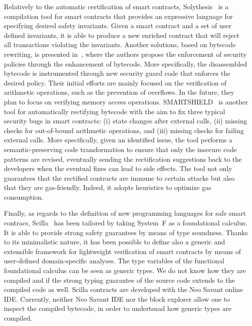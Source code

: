 Relatively to the automatic certification of smart contracts,
Solythesis~\cite{solythesis_solidity_validation} is a compilation tool for smart contracts
that provides an expressive language for specifying desired safety invariants.
Given a smart contract and a set of user defined invariants,
it is able to produce a new enriched contract that will reject all transactions
violating the invariants.
%
Another solutions, based on bytecode rewriting, is presented in~\cite{bytecode_rewriting},
where the authors propose the enforcement of security policies through the enhancement of bytecode.
More specifically, the disassembled bytecode is instrumented through new security guard code
that enforces the desired policy. Their initial efforts are mainly focused on the verification
of arithmetic operations, such as the prevention of overflows. In the future, they plan to focus on
verifying memory access operations.
%
SMARTSHIELD~\cite{smartshield} is another tool for automatically
rectifying bytecode with the aim to fix three typical security bugs in smart contracts:
(i) state changes after external calls, (ii) missing checks for out-of-bound arithmetic operations,
and (iii) missing checks for failing external calls. More specifically, given an identified issue,
the tool performs a semantic-preserving code transformation to ensure that only the insecure code
patterns are revised, eventually sending the rectification suggestions back to the developers
when the eventual fixes can lead to side effects. The tool not only guarantees that the rectified
contracts are immune to certain attacks but also that they are gas-friendly.
Indeed, it adopts heuristics to optimize gas consumption. 


Finally, as regards to the definition of new programming languages for safe smart contracs,
Scilla~\cite{scilla} has been tailored by taking System~F as a foundational calculus.
It is able to provide strong safety guarantees by means of type soundness.
Thanks to its minimalistic nature, it has been possible to define also a generic and extensible
framework for lightweight verification of smart contracts by means of user-defined domain-specific
analyses. The type variables of the functional foundational calculus can be seen as
generic types. We do not know how they are compiled and if the strong typing guarantee of the
source code extends to the compiled code as well. Scilla contracts are developed with
the Neo Savant online IDE. Currently, neither Neo Savant IDE nor the block explorer
allow one to inspect the compiled bytecode, in order to undertsnad how generic types are compiled.
